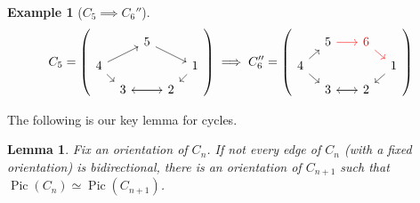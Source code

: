 \documentclass[11pt,reqno]{amsart}
\DeclareMathOperator{\Pic}{Pic}
\theoremstyle{definition}
\newtheorem{myeg}[mydef]{Example}
\theoremstyle{plain}
\newtheorem{lem}[mydef]{Lemma}
\begin{document}
\begin{myeg}[$C_5 \implies C_6''$]
\[
C_5=\left( \begin{tikzcd}[row sep=0.2cm, column sep=0.2cm]
	& & 5 \arrow[drr] & &  \\ 
	4 \arrow[urr] \arrow[dr] & & & & 1 \arrow[dl] \\ 
	& 3 \arrow[rr] & & 2 \arrow[ll]& 
\end{tikzcd}\right)	
\implies C_6''= \left( \begin{tikzcd}[row sep=0.2cm, column sep=0.3cm]
	& 5 \arrow[rr,red]&  & \textcolor{red}{6} \arrow[dr,red] &  \\ 
	4  \arrow[dr] \arrow[ur] & & & & 1 \arrow[dl]  \\ 
	& 3 \arrow[rr] & & 2 \arrow[ll]& 
\end{tikzcd}\right)	
\] 
\end{myeg}

The following is our key lemma for cycles. 


\begin{lem} \label{lemma: key lemma for cycles}
Fix an orientation of $C_n$. If not every edge of $C_n$ (with a fixed orientation) is bidirectional, there is an orientation of $C_{n+1}$ such that $\Pic (C_n) \simeq \Pic (C_{n+1})$. 
\end{lem}
\end{document}
